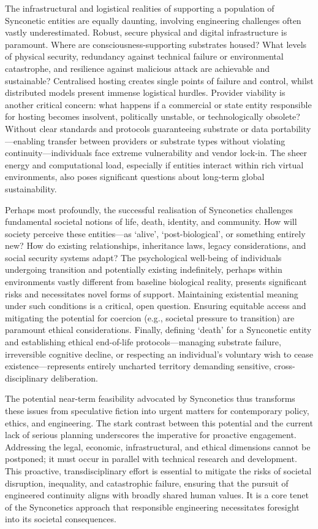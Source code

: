 \documentclass[10pt]{article}
\begin{document}
\begin{sloppypar}
  The infrastructural and logistical realities of supporting a population of Synconetic entities are equally daunting, involving engineering challenges often vastly underestimated. Robust, secure physical and digital infrastructure is paramount. Where are consciousness-supporting substrates housed? What levels of physical security, redundancy against technical failure or environmental catastrophe, and resilience against malicious attack are achievable and sustainable? Centralised hosting creates single points of failure and control, whilst distributed models present immense logistical hurdles. Provider viability is another critical concern: what happens if a commercial or state entity responsible for hosting becomes insolvent, politically unstable, or technologically obsolete? Without clear standards and protocols guaranteeing substrate or data portability—enabling transfer between providers or substrate types without violating continuity—individuals face extreme vulnerability and vendor lock-in. The sheer energy and computational load, especially if entities interact within rich virtual environments, also poses significant questions about long-term global sustainability.

  Perhaps most profoundly, the successful realisation of Synconetics challenges fundamental societal notions of life, death, identity, and community. How will society perceive these entities—as ‘alive’, ‘post-biological’, or something entirely new? How do existing relationships, inheritance laws, legacy considerations, and social security systems adapt? The psychological well-being of individuals undergoing transition and potentially existing indefinitely, perhaps within environments vastly different from baseline biological reality, presents significant risks and necessitates novel forms of support. Maintaining existential meaning under such conditions is a critical, open question. Ensuring equitable access and mitigating the potential for coercion (e.g., societal pressure to transition) are paramount ethical considerations. Finally, defining ‘death’ for a Synconetic entity and establishing ethical end-of-life protocols—managing substrate failure, irreversible cognitive decline, or respecting an individual’s voluntary wish to cease existence—represents entirely uncharted territory demanding sensitive, cross-disciplinary deliberation.

  The potential near-term feasibility advocated by Synconetics thus transforms these issues from speculative fiction into urgent matters for contemporary policy, ethics, and engineering. The stark contrast between this potential and the current lack of serious planning underscores the imperative for proactive engagement. Addressing the legal, economic, infrastructural, and ethical dimensions cannot be postponed; it must occur in parallel with technical research and development. This proactive, transdisciplinary effort is essential to mitigate the risks of societal disruption, inequality, and catastrophic failure, ensuring that the pursuit of engineered continuity aligns with broadly shared human values. It is a core tenet of the Synconetics approach that responsible engineering necessitates foresight into its societal consequences.


\end{sloppypar}
\end{document}
